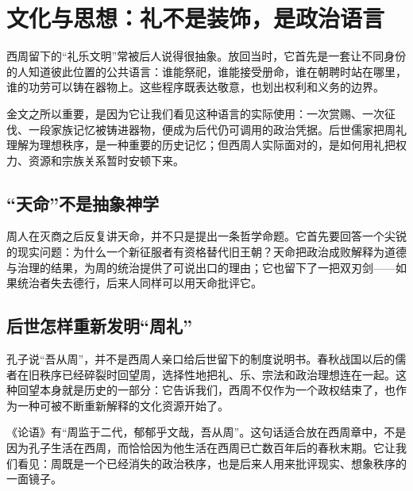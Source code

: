 \section{文化与思想：礼不是装饰，是政治语言}

西周留下的“礼乐文明”常被后人说得很抽象。放回当时，它首先是一套让不同身份的人知道彼此位置的公共语言：谁能祭祀，谁能接受册命，谁在朝聘时站在哪里，谁的功劳可以铸在器物上。这些程序既表达敬意，也划出权利和义务的边界。

金文之所以重要，是因为它让我们看见这种语言的实际使用：一次赏赐、一次征伐、一段家族记忆被铸进器物，便成为后代仍可调用的政治凭据。后世儒家把周礼理解为理想秩序，是一种重要的历史记忆；但西周人实际面对的，是如何用礼把权力、资源和宗族关系暂时安顿下来。

\subsection{“天命”不是抽象神学}

周人在灭商之后反复讲天命，并不只是提出一条哲学命题。它首先要回答一个尖锐的现实问题：为什么一个新征服者有资格替代旧王朝？天命把政治成败解释为道德与治理的结果，为周的统治提供了可说出口的理由；它也留下了一把双刃剑——如果统治者失去德行，后来人同样可以用天命批评它。

\subsection{后世怎样重新发明“周礼”}

孔子说“吾从周”，并不是西周人亲口给后世留下的制度说明书。春秋战国以后的儒者在旧秩序已经碎裂时回望周，选择性地把礼、乐、宗法和政治理想连在一起。这种回望本身就是历史的一部分：它告诉我们，西周不仅作为一个政权结束了，也作为一种可被不断重新解释的文化资源开始了。

\begin{textwindow}[后来的孔子怎样回望周]
《论语》有“周监于二代，郁郁乎文哉，吾从周”。这句话适合放在西周章中，不是因为孔子生活在西周，而恰恰因为他生活在西周已亡数百年后的春秋末期。它让我们看见：周既是一个已经消失的政治秩序，也是后来人用来批评现实、想象秩序的一面镜子。
\end{textwindow}
